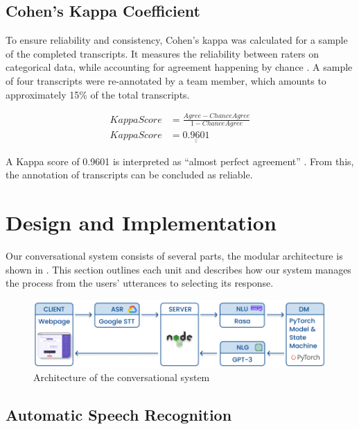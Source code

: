 \documentclass[hidelinks, 11pt]{article}
\begin{document}
\subsection{Cohen's Kappa Coefficient}
To ensure reliability and consistency, Cohen's kappa was calculated for a sample of the completed transcripts. It measures the reliability between raters on categorical data, while accounting for agreement happening by chance \cite{Cohen_1960}. A sample of four transcripts were re-annotated by a team member, which amounts to approximately 15\% of the total transcripts.

\begin{equation}
  \begin{split}
    KappaScore & = \frac{Agree - ChanceAgree}{1 - ChanceAgree} \\
    KappaScore & = \underline{\underline{0.9601}}
  \end{split}
\end{equation}

\noindent
A Kappa score of 0.9601 is interpreted as ``almost perfect agreement'' \cite{McHugh_2012}. From this, the annotation of transcripts can be concluded as reliable.


\section{Design and Implementation}
\label{sec:implementation}

Our conversational system consists of several parts, the modular architecture is shown in . This section outlines each unit and describes how our system manages the process from the users' utterances to selecting its response.

\begin{figure}
  \includegraphics[width=\textwidth]{images/sys_graph.jpg}
  \caption{Architecture of the conversational system}
  \label{fig:system_architecture}
\end{figure}

\subsection{Automatic Speech Recognition}
\label{subsec:asr}
\end{document}
